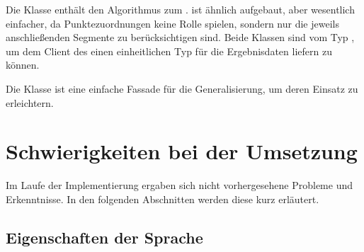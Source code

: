 \documentclass[../main/thesis.tex]{subfiles}
\begin{document}
Die Klasse  enthält den Algorithmus zum .
 ist ähnlich aufgebaut, aber wesentlich einfacher, da Punktezuordnungen keine Rolle spielen, sondern nur die jeweils anschließenden Segmente zu berücksichtigen sind.
Beide Klassen sind vom Typ , um dem Client des  einen einheitlichen Typ für die Ergebnisdaten liefern zu können.

Die Klasse  ist eine einfache Fassade für die Generalisierung, um deren Einsatz zu erleichtern.




%



\section{Schwierigkeiten bei der Umsetzung}
\label{ch:impl-difficulties}

Im Laufe der Implementierung ergaben sich nicht vorhergesehene Probleme und Erkenntnisse.
In den folgenden Abschnitten werden diese kurz erläutert.



\subsection{Eigenschaften der Sprache}
\end{document}
